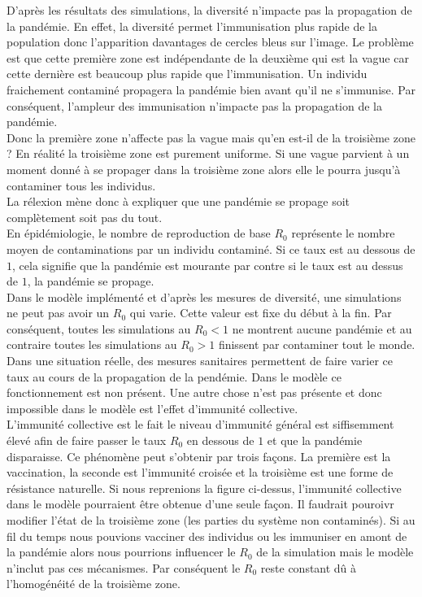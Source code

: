 D'après les résultats des simulations, la diversité n'impacte pas la propagation de la pandémie. En effet, la diversité permet l'immunisation plus rapide de la population donc l'apparition davantages de cercles bleus sur l'image. Le problème est que cette première zone est indépendante de la deuxième qui est la vague car cette dernière est beaucoup plus rapide que l'immunisation. Un individu fraichement contaminé propagera la pandémie bien avant qu'il ne s'immunise. Par conséquent, l'ampleur des immunisation n'impacte pas la propagation de la pandémie.\\

Donc la première zone n'affecte pas la vague mais qu'en est-il de la troisième zone ? En réalité la troisième zone est purement uniforme. Si une vague parvient à un moment donné à se propager dans la troisième zone alors elle le pourra jusqu'à contaminer tous les individus.\\

La rélexion mène donc à expliquer que une pandémie se propage soit complètement soit pas du tout.\\

En épidémiologie, le nombre de reproduction de base $R_0$ représente le nombre moyen de contaminations par un individu contaminé. Si ce taux est au dessous de $1$, cela signifie que la pandémie est mourante par contre si le taux est au dessus de $1$, la pandémie se propage.\\

Dans le modèle implémenté et d'après les mesures de diversité, une simulations ne peut pas avoir un $R_0$ qui varie. Cette valeur est fixe du début à la fin. Par conséquent, toutes les simulations au $R_0 < 1$ ne montrent aucune pandémie et au contraire toutes les simulations au $R_0 > 1$ finissent par contaminer tout le monde. Dans une situation réelle, des mesures sanitaires permettent de faire varier ce taux au cours de la propagation de la pendémie. Dans le modèle ce fonctionnement est non présent. Une autre chose n'est pas présente et donc impossible dans le modèle est l'effet d'immunité collective.\\

L'immunité collective est le fait le niveau d'immunité général est siffisemment élevé afin de faire passer le taux $R_0$ en dessous de $1$ et que la pandémie disparaisse. Ce phénomène peut s'obtenir par trois façons. La première est la vaccination, la seconde est l'immunité croisée et la troisième est une forme de résistance naturelle. Si nous reprenions la figure ci-dessus, l'immunité collective dans le modèle pourraient être obtenue d'une seule façon. Il faudrait pouroivr modifier l'état de la troisième zone (les parties du système non contaminés). Si au fil du temps nous pouvions vacciner des individus ou les immuniser en amont de la pandémie alors nous pourrions influencer le $R_0$ de la simulation mais le modèle n'inclut pas ces mécanismes. Par conséquent le $R_0$ reste constant dû à l'homogénéité de la troisième zone.


